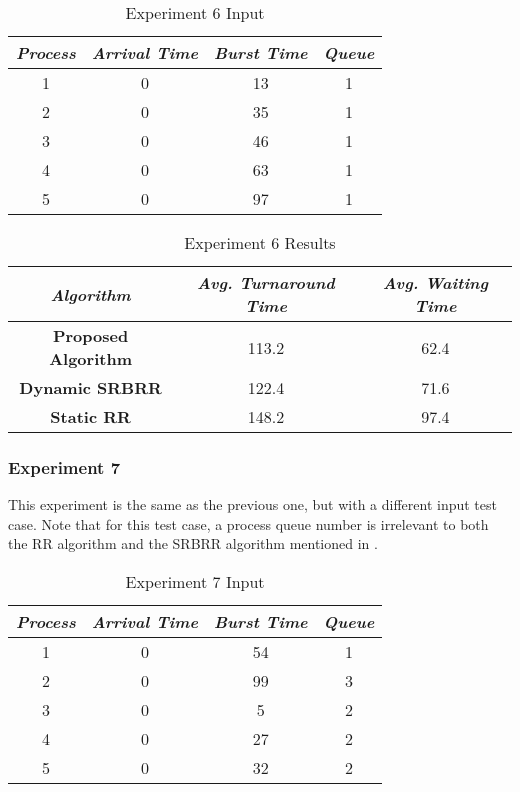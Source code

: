 \documentclass[conference]{IEEEtran}
\newcommand\T{\rule{0pt}{2.6ex}}       %
\newcommand\B{\rule[-1.2ex]{0pt}{0pt}} %
\begin{document}
\begin{table}[H]
    \caption{Experiment 6 Input}
    \centering
     \begin{tabular}{||c c c c||} 
     \hline
     \textit{\textbf{Process}} & \textit{\textbf{Arrival Time}} & \textit{\textbf{Burst Time}} & \textit{\textbf{Queue}} \T \B \\ 
     \hline
     \hline
     1 & 0 & 13 & 1 \T \B \\ 
     \hline
     2 & 0 & 35 & 1 \T \B \\
     \hline
     3 & 0 & 46 & 1 \T \B \\
     \hline
     4 & 0 & 63 & 1 \T \B \\
     \hline
     5 & 0 & 97 & 1 \T \B \\ 
     \hline
     \end{tabular}
\end{table}

\begin{table}[H]
    \caption{Experiment 6 Results}
    \centering
    \begin{tabular}{||c c c||}
        \hline
        \textit{\textbf{Algorithm}} & \textit{\textbf{Avg. Turnaround Time}} & \textit{\textbf{Avg. Waiting Time}}\T \B \\
    \hline
    \hline
    \textbf{Proposed Algorithm} & 113.2 & 62.4 \T \B\\ \hline
    \textbf{Dynamic SRBRR} & 122.4 & 71.6 \T \B\\ \hline
    \textbf{Static RR} & 148.2 & 97.4 \T \B\\ \hline
     \end{tabular}
\end{table}

\subsubsection{Experiment 7}

This experiment is the same as the previous one, but with a different input test case. Note that for this test case, a process queue number is irrelevant to both the RR algorithm and the SRBRR algorithm mentioned in \cite{b3}.

\begin{table}[H]
    \caption{Experiment 7 Input}
    \centering
     \begin{tabular}{||c c c c||} 
     \hline
     \textit{\textbf{Process}} & \textit{\textbf{Arrival Time}} & \textit{\textbf{Burst Time}} & \textit{\textbf{Queue}} \T \B \\ 
     \hline
     \hline
     1 & 0 & 54 & 1 \T \B \\ 
     \hline
     2 & 0 & 99 & 3 \T \B \\
     \hline
     3 & 0 & 5 & 2 \T \B \\
     \hline
     4 & 0 & 27 & 2 \T \B \\
     \hline
     5 & 0 & 32 & 2 \T \B \\ 
     \hline
     \end{tabular}
\end{table}
\end{document}
